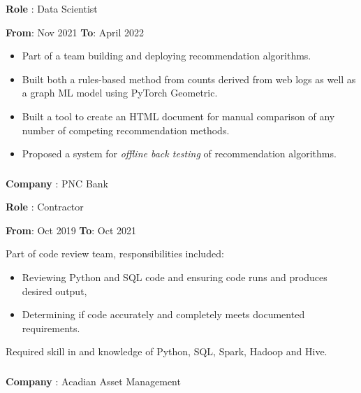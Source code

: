 \documentclass[
]{article}
\providecommand{\tightlist}{%
  \setlength{\itemsep}{0pt}\setlength{\parskip}{0pt}}
\begin{document}
\begin{flushleft}
\textbf{Role} : Data Scientist
\end{flushleft}
{\textbf{From}: Nov 2021 \hspace{0.5in}  \textbf{To}: April 2022}
\begin{itemize}
\tightlist
\item
  Part of a team building and deploying recommendation algorithms.
\item
  Built both a rules-based method from counts derived from web logs as
  well as a graph ML model using PyTorch Geometric.
\item
  Built a tool to create an HTML document for manual comparison of any
  number of competing recommendation methods.
\item
  Proposed a system for \emph{offline back testing} of recommendation
  algorithms.
\end{itemize}


\hypertarget{pnc}{\subsubsection{}\label{pnc}}
\begin{flushleft}
\textbf{Company} : PNC Bank
\end{flushleft}

\begin{flushleft}
\textbf{Role} : Contractor
\end{flushleft}

\textbf{From}: Oct 2019 \hspace{0.5in} \textbf{To}: Oct 2021

Part of code review team, responsibilities included:

\begin{itemize}
\tightlist
\item
  Reviewing Python and SQL code and ensuring code runs and produces
  desired output,
\item
  Determining if code accurately and completely meets documented
  requirements.
\end{itemize}
Required skill in and knowledge of Python, SQL, Spark, Hadoop and Hive.


\hypertarget{acadian}{\subsubsection{}\label{acadian}}
\begin{flushleft}
\textbf{Company} : Acadian Asset Management
\end{flushleft}
\end{document}
